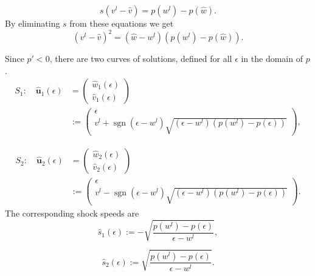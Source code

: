 \begin{equation}\label{eq:p-system-shock-velocity-rh}
s(v^l-\hat v)=p(w^l)-p(\hat w).
\end{equation}
By eliminating $s$ from these equations we get
\begin{equation}\label{eq:p-system-shock-eliminated-speed}
(v^l-\hat v)^2=(\hat w-w^l)(p(w^l)-p(\hat w)).
\end{equation}


Since $p'<0$, there are two curves of solutions, defined for all $\epsilon$ in the domain of $p$.
\begin{equation}\label{eq:p-system-first-shock-curve}
\begin{aligned}
S_1:\quad\hat{\bm{u}}_1(\epsilon)&=\begin{pmatrix}\hat w_1(\epsilon)\\\hat v_1(\epsilon)\end{pmatrix}\\
&:=\begin{pmatrix}\epsilon\\v^l+\operatorname{sgn}(\epsilon-w^l)\sqrt{(\epsilon-w^l)(p(w^l)-p(\epsilon))}\end{pmatrix},
\end{aligned}
\end{equation}

\begin{equation}\label{eq:p-system-second-shock-curve}
\begin{aligned}
S_2:\quad\hat{\bm{u}}_2(\epsilon)&=\begin{pmatrix}\hat w_2(\epsilon)\\\hat v_2(\epsilon)\end{pmatrix}\\
&:=\begin{pmatrix}\epsilon\\v^l-\operatorname{sgn}(\epsilon-w^l)\sqrt{(\epsilon-w^l)(p(w^l)-p(\epsilon))}\end{pmatrix}.
\end{aligned}
\end{equation}
The corresponding shock speeds are
\begin{equation}\label{eq:p-system-first-shock-curve-speed}
\hat s_1(\epsilon):=-\sqrt{\dfrac{p(w^l)-p(\epsilon)}{\epsilon-w^l}},
\end{equation}

\begin{equation}\label{eq:p-system-second-shock-curve-speed}
\hat s_2(\epsilon):=\sqrt{\dfrac{p(w^l)-p(\epsilon)}{\epsilon-w^l}}.
\end{equation}


